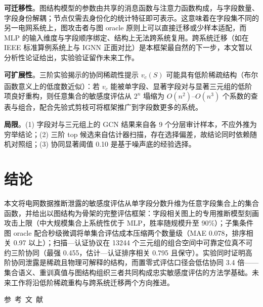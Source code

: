 \documentclass[10.5pt,compsoc,UTF8]{CjC}
\theoremstyle{mystyle}
\newcommand{\upcite}[1]{\textsuperscript{\cite{#1}}}
\begin{document}
\textbf{可迁移性}。图结构模型的参数由共享的消息函数与注意力函数构成，与字段数量、字段身份解耦；节点仅需去身份化的统计特征即可表示。这意味着在字段集不同的另一电网系统上，图攻击者与图 oracle 原则上可以直接迁移或少样本适配，而 MLP 的输入维度与字段顺序绑定、结构上无法跨系统复用。跨系统迁移（如在 IEEE 标准算例系统上与 IGNN 正面对比）是本框架最自然的下一步，本文暂以分析性论证给出，实验验证留作未来工作。

\textbf{可扩展性}。三阶实验揭示的协同稀疏性提示 $v_c(S)$ 可能具有低阶稀疏结构（布尔函数意义上的低度数近似\upcite{odonnell2014boolean}）：若 $v_c$ 能被单字段、显著字段对与显著三元组的低阶项良好重构，则任意集合的敏感度评估从 $2^n$ 塌缩为 $O(n^2)$--$O(n^3)$ 个系数的查表与组合，配合先验式剪枝可将框架推广到字段数更多的系统。

\textbf{局限}。(1) 字段对与三元组上的 GCN 结果来自各 9 个分层审计样本，不应外推为穷举结论；(2) 三阶 top 候选来自估计器扫描，存在选择偏差，故结论同时依赖随机对照组；(3) 协同显著阈值 0.10 是基于噪声底的经验选择。

\section{\heiti 结论}

本文将电网数据推断泄露的敏感度评估从单字段分数升维为任意字段集合上的集合函数，并给出以图结构为骨架的完整评估框架：字段相关图上的专用推断模型刻画攻击上限（中大规模集合上系统性优于 MLP，胜率随规模升至 90\%）；子集条件图 oracle 配合秒级微调将单集合评估成本压缩两个数量级（MAE 0.078，排序相关 0.97 以上）；扫描—认证协议在 13244 个三元组的组合空间中可靠定位真不可约三阶协同（最强 0.455，估计—认证排序相关 0.795 且保守）。实验同时证明高阶协同泄露是稀疏且物理可解释的结构，而置零式评估口径会低估协同 3.4 倍——集合语义、重训真值与图结构组织三者共同构成忠实敏感度评估的方法学基础。未来工作将沿低阶稀疏重构与跨系统迁移两个方向推进。

\vspace {10mm}
\centerline
{\textsf{参~考~文~献}}
 \addtolength{\itemsep}{-1em}
\vspace {1.5mm}


\end{document}
